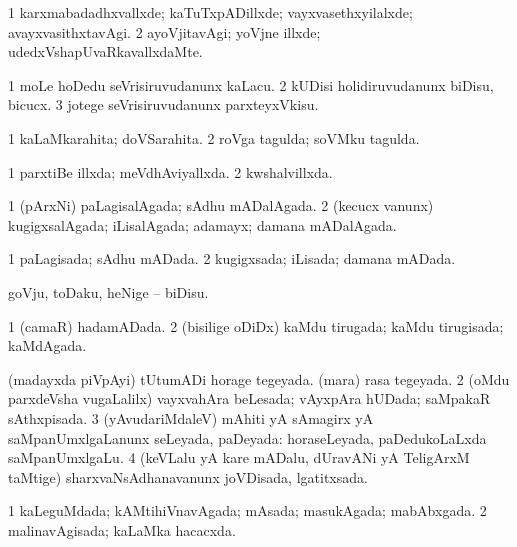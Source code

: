 {{\bentry
{} 
\gl{\kirxvi}
\bmng
\bnum
\num{1} karxmabadadhxvallxde; kaTuTxpADillxde; vayxvasethxyilalxde; avayxvasithxtavAgi. 
\num{2} ayoVjitavAgi; yoVjne illxde; udedxVshapUvaRkavallxdaMte. 
\enum
\emng
\eentry

\bentry
{} 
\gl{\sakirx}
\expl{}
\bmng
\bnum
\num{1} moLe hoDedu seVrisiruvudanunx kaLacu. 
\num{2} kUDisi holidiruvudanunx biDisu, bicucx. 
\num{3} jotege seVrisiruvudanunx parxteyxVkisu. 
\enum
\emng
\eentry

\bentry
{} 
\gl{\gu}
\expl{}
\bmng
\bnum
\num{1} kaLaMkarahita; doVSarahita. 
\num{2} roVga tagulda; soVMku tagulda. 
\enum
\emng
\eentry

\bentry
{} 
\gl{\gu}
\expl{}
\bmng
\bnum
\num{1} parxtiBe illxda; meVdhAviyallxda. 
\num{2} kwshalvillxda. 
\enum
\emng
\eentry

\bentry
{} 
\gl{\gu}
\expl{}
\bmng
\bnum
\num{1} (pArxNi) paLagisalAgada; sAdhu mADalAgada. 
\num{2} (kecucx \mo vanunx) kugigxsalAgada; iLisalAgada; adamayx; damana mADalAgada. 
\enum
\emng
\eentry

\bentry
{} 
\gl{\gu}
\expl{}
\bmng
\bnum
\num{1} paLagisada; sAdhu mADada. 
\num{2} kugigxsada; iLisada; damana mADada. 
\enum
\emng
\eentry

\bentry
{} 
\gl{\sakirx}
\expl{}
\bmng
goVju, toDaku, heNige -- biDisu. 
\emng
\eentry

\bentry
{} 
\gl{\gu}
\expl{}
\bmng
\bnum
\num{1} (camaR) hadamADada. 
\num{2} (bisilige oDiDx) kaMdu tirugada; kaMdu tirugisada; kaMdAgada. 
\enum
\emng
\eentry

\bentry
{} 
\gl{\gu}
\expl{}
\bmng
\bnum
{}
\banum
{} (madayxda piVpAyi) tUtumADi horage tegeyada. 
 (mara) rasa tegeyada. 
\eanum
\numie
\num{2} (oMdu parxdeVsha \mo vugaLalilx) vayxvahAra beLesada; vAyxpAra hUDada; saMpakaR sAthxpisada. 
\num{3} (yAvudariMdaleV) mAhiti yA sAmagirx yA saMpanUmxlgaLanunx seLeyada, paDeyada:  horaseLeyada, paDedukoLaLxda saMpanUmxlgaLu. 
\num{4} (keVLalu yA kare mADalu, dUravANi yA TeligArxM taMtige) sharxvaNsAdhanavanunx joVDisada, lgatitxsada. 
\enum
\emng
\eentry

\bentry
{} 
\gl{\gu}
\expl{}
\bmng
\bnum
\num{1} kaLeguMdada; kAMtihiVnavAgada; mAsada; masukAgada; mabAbxgada. 
\num{2} malinavAgisada; kaLaMka hacacxda. 
\enum
\emng
\eentry

}}
